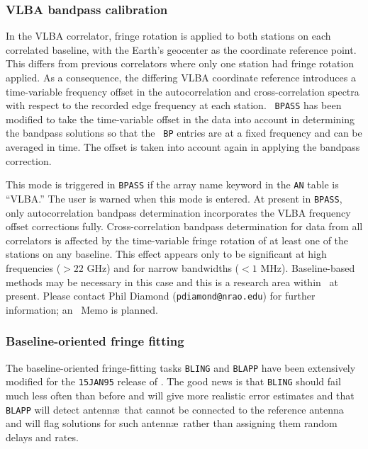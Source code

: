 \vfill
\eject
\subsubsection{VLBA bandpass calibration}

In the VLBA correlator, fringe rotation is applied to both stations on
each correlated baseline, with the Earth's geocenter as the coordinate
reference point.  This differs from previous correlators where only
one station had fringe rotation applied.  As a consequence, the
differing VLBA coordinate reference introduces a time-variable
frequency offset in the autocorrelation and cross-correlation spectra
with respect to the recorded edge frequency at each station.  {\tt
BPASS} has been modified to take the time-variable offset in the data
into account in determining the bandpass solutions so that the {\tt
BP} entries are at a fixed frequency and can be averaged in time.  The
offset is taken into account again in applying the bandpass correction.

This mode is triggered in {\tt BPASS} if the array name keyword in the
{\tt AN} table is ``\hbox{VLBA}.''  The user is warned when this mode
is entered.  At present in {\tt BPASS}, only autocorrelation bandpass
determination incorporates the VLBA  frequency offset corrections
fully.  Cross-correlation bandpass determination for data from all
correlators is affected by the time-variable fringe rotation of at
least one of the stations on any baseline.  This effect appears only
to be significant at high frequencies ($> 22$ GHz) and for narrow
bandwidths ($< 1$ MHz).  Baseline-based methods may be necessary in
this case and this is a research area within \AIPS\ at present.
Please contact Phil Diamond ({\tt pdiamond@nrao.edu}) for further
information; an \AIPS\ Memo is planned.

\subsubsection{Baseline-oriented fringe fitting}

The baseline-oriented fringe-fitting tasks {\tt BLING} and {\tt BLAPP}
have been extensively modified for the {\tt 15JAN95} release of
\hbox{\AIPS}.  The good news is that {\tt BLING} should fail much less
often than before and will give more realistic error estimates and
that {\tt BLAPP} will detect antenn\ae\ that cannot be connected to the
reference antenna and will flag solutions for such antenn\ae\ rather
than assigning them random delays and rates.

